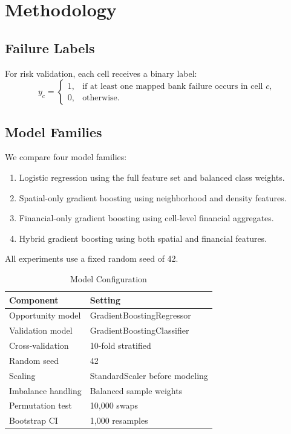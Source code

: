 \documentclass[conference]{IEEEtran}
\begin{document}
\section{Methodology}
\subsection{Failure Labels}
For risk validation, each cell receives a binary label:
\begin{equation}
    y_c =
    \begin{cases}
    1, & \text{if at least one mapped bank failure occurs in cell } c,\\
    0, & \text{otherwise.}
    \end{cases}
\end{equation}

\subsection{Model Families}
We compare four model families:
\begin{enumerate}
    \item Logistic regression using the full feature set and balanced class
    weights.
    \item Spatial-only gradient boosting using neighborhood and density
    features.
    \item Financial-only gradient boosting using cell-level financial
    aggregates.
    \item Hybrid gradient boosting using both spatial and financial
    features.
\end{enumerate}
All experiments use a fixed random seed of 42.

\begin{table}[t]
\caption{Model Configuration}
\label{tab:model_config}
\centering
\begin{tabular}{ll}
\toprule
Component & Setting \\
\midrule
Opportunity model & GradientBoostingRegressor \\
Validation model & GradientBoostingClassifier \\
Cross-validation & 10-fold stratified \\
Random seed & 42 \\
Scaling & StandardScaler before modeling \\
Imbalance handling & Balanced sample weights \\
Permutation test & 10,000 swaps \\
Bootstrap CI & 1,000 resamples \\
\bottomrule
\end{tabular}
\end{table}
\end{document}
